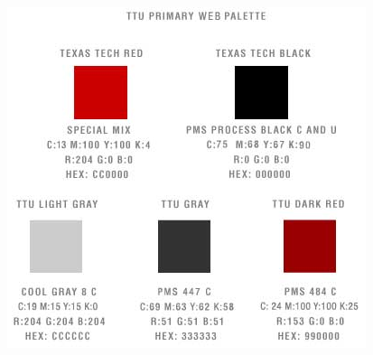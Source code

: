 \documentclass[12pt]{exam}
\begin{document}
\begin{center}
\emph{\\}\includegraphics[scale=0.30]{capture.PNG}\\
\end{center}
\end{document}
